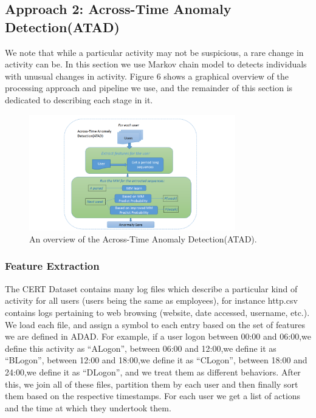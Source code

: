 \documentclass[conference]{IEEEtran}
\begin{document}
\subsection{Approach 2: Across-Time Anomaly Detection(ATAD)}

We note that while a particular activity may not be suspicious, a rare change in activity can be. In this section we use Markov chain model \cite{b45} to detects individuals with unusual changes in activity. Figure 6 shows a graphical overview of the processing approach and pipeline we use, and the remainder of this section is dedicated to describing each stage in it.

\begin{figure}[htb]
\centerline{\includegraphics[width = 0.8\textwidth]{figure/figure6.png}}
\caption{An overview of the Across-Time Anomaly Detection(ATAD).}
\label{fig}
\end{figure}
\subsubsection{Feature Extraction}

The CERT Dataset contains many log files which describe a particular kind of activity for all users (users being the same as employees), for instance http.csv contains logs pertaining to web browsing (website, date accessed, username, etc.). We load each file, and assign a symbol to each entry based on the set of features we are defined in ADAD. For example, if a user logon between 00:00 and 06:00,we define this activity as “ALogon”, between 06:00 and 12:00,we define it as “BLogon”, between 12:00 and 18:00,we define it as “CLogon”, between 18:00 and 24:00,we define it as “DLogon”, and we treat them as different behaviors. After this, we join all of these files, partition them by each user and then finally sort them based on the respective timestamps. For each user we get a list of actions and the time at which they undertook them.
\end{document}
